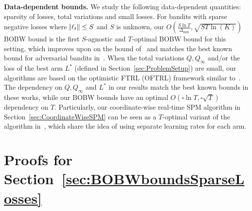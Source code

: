 \textbf{Data-dependent bounds.} We study the following data-dependent quantities: sparsity of losses, total variations and small losses. 
For bandits with sparse negative losses where $\norm{\ell_t} \leq S$ and $S$ is unknown, our $O(\frac{S\ln{T}}{\Delta_{\min}}, \sqrt{ST\ln(K)})$ BOBW bound is the first $S$-agnostic and $T$-optimal BOBW bound for this setting, which improves upon on the bound of~\citet{Tsuchiya2023stabilitypenaltyadaptive} and matches the best known bound for adversarial bandits in~\citet{Bubeck2018ALT}.
When the total variations $Q, Q_\infty$ and/or the loss of the best arm $L^*$ (defined in Section~\ref{sec:ProblemSetup}) are small, our algorithms are based on the optimistic FTRL (OFTRL) framework similar to~\citet{HazanAndKale11a,Bubeck2018ALT,ItoCOLT2022aVariance}. 
The dependency on $Q, Q_\infty$ and $L^*$ in our results match the best known bounds in these works, while our BOBW bounds have an optimal $O(\square\ln{T}, \square\sqrt{T})$ dependency on $T$. 
Particularly, our coordinate-wise real-time SPM algorithm in Section~\ref{sec:CoordinateWiseSPM} can be seen as a $T$-optimal variant of the algorithm in~\citet{ItoCOLT2022aVariance}, which share the idea of using separate learning rates for each arm.


\section{Proofs for Section~\ref{sec:BOBWboundsSparseLosses}}
